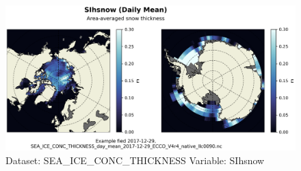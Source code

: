 \begin{figure}[H]
\centering
\includegraphics[scale=0.55]{../images/plots/native_plots/Sea-Ice_and_Snow_Concentration_and_Thickness/SIhsnow.png}
\caption{Dataset: SEA\_ICE\_CONC\_THICKNESS Variable: SIhsnow}
\label{tab:table-SEA_ICE_CONC_THICKNESS_SIhsnow-Plot}
\end{figure}
\pagebreak
